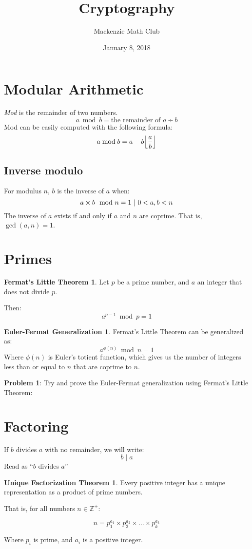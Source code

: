 

\usepackage{amsthm}

\title{Cryptography}
\author{Mackenzie Math Club}
\date{January 8, 2018}


\newcommand{\divides}{\operatorname{|}}

\theoremstyle{definition}
\newtheorem*{fermatLittle}{Fermat's Little Theorem}
\newtheorem*{eulerFermat}{Euler-Fermat Generalization}
\newtheorem*{uniqueFactorization}{Unique Factorization Theorem}


	\section*{Modular Arithmetic}
		\emph{Mod} is the remainder of two numbers.
		\[a \bmod b = \text{the remainder of } a \div b\]
		Mod can be easily computed with the following formula:
		\[a \bmod b = a - b \floor*{\frac{a}{b}}\]
		\subsection{Inverse modulo}
			For modulus $n$, $b$ is the inverse of $a$ when:
			\[a \times b \mod n = 1 \ |\  0 < a, b < n\]
			The inverse of $a$ exists if and only if $a$ and $n$ are coprime. That is, $\gcd(a, n) = 1$.
	\section*{Primes}
		\begin{fermatLittle}
			Let $p$ be a prime number, and $a$ an integer that does not divide $p$.

			Then:
			\[a^{p-1} \bmod p = 1\]
		\end{fermatLittle}
		\begin{eulerFermat}
			Fermat's Little Theorem can be generalized as:
			\[a^{\phi(n)} \bmod n = 1\]
			Where $\phi(n)$ is Euler's totient function, which gives us the number of integers less than or equal to $n$ that are coprime to $n$.
		\end{eulerFermat}
		\textbf{Problem 1}: Try and prove the Euler-Fermat generalization using Fermat's Little Theorem:
		\solutionspace{1in}
	\section*{Factoring}
		If $b$ divides $a$ with no remainder, we will write:
		\[b \divides a\]
		Read as ``$b$ divides $a$''
		\begin{uniqueFactorization}
			Every positive integer has a unique representation as a product of prime numbers.

			That is, for all numbers $n \in \mathbb{Z}^+$:
			
			\[n = p_1^{a_1} \times p_2^{a_2} \times \dots \times p_k^{a_k}\]

			Where $p_i$ is prime, and $a_i$ is a positive integer.
		\end{uniqueFactorization}
